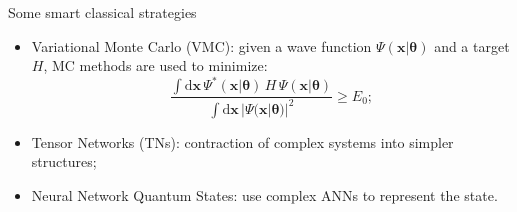 \documentclass[aspectratio=169, 8pt, xcolor={svgnames}, hyperref={linkcolor=black}]{beamer}
\begin{document}
\begin{frame}{Some smart classical strategies}
   \begin{itemize}[noitemsep]
      \item<2,3,4>[1.] Variational Monte Carlo (VMC): given a wave function $\Psi(\bm{x}|\bm{\theta})$ and a target $H$, MC methods are used to minimize:
      $$ \frac{\int \text{d}\bm{x}\, \Psi^*(\bm{x}|\bm{\theta})\, H \,
      \Psi(\bm{x}|\bm{\theta})}{\int \text{d}\bm{x}\, |\Psi(\bm{x}|\bm{\theta})|^2}\geq E_0; $$
      \item<3,4>[2.] Tensor Networks (TNs): contraction of complex systems into simpler structures;
      \item<4>[3.] Neural Network Quantum States: use complex ANNs to represent the state.
   \end{itemize}
   \begin{multicols}{3}
   \begin{figure}
\end{figure}
\end{multicols}
\end{frame}
\end{document}
